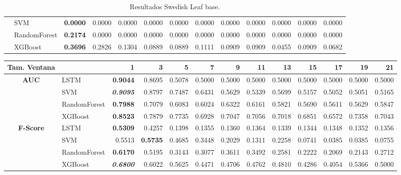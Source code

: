 \begin{table}[H]
\begin{adjustbox}{max width=14cm}
\begin{tabular}{|c|l|r|r|r|r|r|r|r|r|r|r|r|}
		&  SVM & \textbf{  0.0000 } &  0.0000 &  0.0000 &  0.0000 &  0.0000 &  0.0000 &  0.0000 &  0.0000 &  0.0000 &  0.0000 &  0.0000 \\
		&  RandomForest & \textbf{  0.2174 } &  0.0000 &  0.0000 &  0.0000 &  0.0000 &  0.0000 &  0.0000 &  0.0000 &  0.0000 &  0.0000 &  0.0000 \\
		&  XGBoost & \textbf{  0.3696 } &  0.2826 &  0.1304 &  0.0889 &  0.0889 &  0.1111 &  0.0909 &  0.0909 &  0.0455 &  0.0909 &  0.0682 \\
		\hline
	\end{tabular}
\end{adjustbox}
\caption{Resultados Swedish Leaf base.}
\label{tab:SLeaf_base}
\end{table}

\begin{table}[H]
\centering
\begin{adjustbox}{max width=14cm}
	\begin{tabular}{|c|l|r|r|r|r|r|r|r|r|r|r|r|}
		\hline
		\textbf{Tam. Ventana} &         &      1  &      3  &      5  &      7  &      9  &      11 &      13 &      15 &      17 &      19 &      21 \\
		\hline
		\textbf{AUC} &  LSTM & \textbf{  0.9044 } &  0.8695 &  0.5078 &  0.5000 &  0.5000 &  0.5000 &  0.5000 &  0.5000 &  0.5000 &  0.5000 &  0.5000 \\
		&  SVM & \textit{ \textbf{  0.9095 } } &  0.8797 &  0.7487 &  0.6431 &  0.5629 &  0.5339 &  0.5699 &  0.5157 &  0.5052 &  0.5051 &  0.5165 \\
		&  RandomForest & \textbf{  0.7988 } &  0.7079 &  0.6083 &  0.6024 &  0.6322 &  0.6161 &  0.5821 &  0.5690 &  0.5611 &  0.5629 &  0.5847 \\
		&  XGBoost & \textbf{  0.8523 } &  0.7879 &  0.7735 &  0.6928 &  0.7047 &  0.7056 &  0.7018 &  0.6851 &  0.6572 &  0.7358 &  0.7043 \\
		\hline
		\textbf{F-Score} &  LSTM & \textbf{  0.5309 } &  0.4257 &  0.1398 &  0.1355 &  0.1360 &  0.1364 &  0.1339 &  0.1344 &  0.1348 &  0.1352 &  0.1356 \\
		&  SVM &  0.5513 & \textbf{  0.5735 } &  0.4685 &  0.3448 &  0.2029 &  0.1311 &  0.2258 &  0.0741 &  0.0385 &  0.0385 &  0.0755 \\
		&  RandomForest & \textbf{  0.6170 } &  0.5195 &  0.3143 &  0.3077 &  0.3611 &  0.3492 &  0.2581 &  0.2222 &  0.2069 &  0.2143 &  0.2712 \\
		&  XGBoost & \textit{ \textbf{  0.6800 } } &  0.6022 &  0.5625 &  0.4471 &  0.4706 &  0.4762 &  0.4810 &  0.4286 &  0.4054 &  0.5366 &  0.5000 \\

\end{tabular}
\end{adjustbox}
\end{table}
